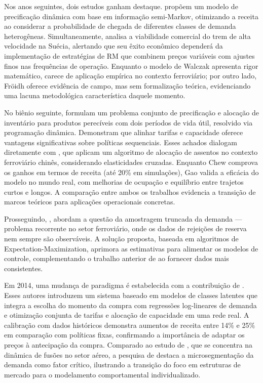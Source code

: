 Nos anos seguintes, dois estudos ganham destaque. \citet{Walczak2007} propõem um modelo de precificação dinâmica com base em informação semi-Markov, otimizando a receita ao considerar a probabilidade de chegada de diferentes classes de demanda heterogêneas. Simultaneamente, \citet{FROIDH2008268} analisa a viabilidade comercial do trem de alta velocidade na Suécia, alertando que seu êxito econômico dependerá da implementação de estratégias de RM que combinem preços variáveis com ajustes finos nas frequências de operação. Enquanto o modelo de Walczak apresenta rigor matemático, carece de aplicação empírica no contexto ferroviário; por outro lado, Fröidh oferece evidência de campo, mas sem formalização teórica, evidenciando uma lacuna metodológica característica daquele momento.

No biênio seguinte, \citet{CHEW2009} formulam um problema conjunto de precificação e alocação de inventário para produtos perecíveis com dois períodos de vida útil, resolvido via programação dinâmica. Demonstram que alinhar tarifas e capacidade oferece vantagens significativas sobre políticas sequenciais. Esses achados dialogam diretamente com \citet{Gao2010}, que aplicam um algoritmo de alocação de assentos no contexto ferroviário chinês, considerando elasticidades cruzadas. Enquanto Chew comprova os ganhos em termos de receita (até 20\% em simulações), Gao valida a eficácia do modelo no mundo real, com melhorias de ocupação e equilíbrio entre trajetos curtos e longos. A comparação entre ambos os trabalhos evidencia a transição de marcos teóricos para aplicações operacionais concretas.

Prosseguindo, \citet{Guo2012}, abordam a questão da amostragem truncada da demanda — problema recorrente no setor ferroviário, onde os dados de rejeições de reserva nem sempre são observáveis. A solução proposta, baseada em algoritmos de Expectation-Maximization, aprimora as estimativas para alimentar os modelos de controle, complementando o trabalho anterior de \citet{Walczak2007} ao fornecer dados mais consistentes.

Em 2014, uma mudança de paradigma é estabelecida com a contribuição de \citet{HETRAKUL201468}. Esses autores introduzem um sistema baseado em modelos de classes latentes que integra a escolha do momento da compra com regressões log-lineares de demanda e otimização conjunta de tarifas e alocação de capacidade em uma rede real. A calibração com dados históricos demonstra aumentos de receita entre 14\% e 25\% em comparação com políticas fixas, confirmando a importância de adaptar os preços à antecipação da compra. Comparado ao estudo de \citet{Dobson2013}, que se concentra na dinâmica de fusões no setor aéreo, a pesquisa de \citet{HETRAKUL201468} destaca a microsegmentação da demanda como fator crítico, ilustrando a transição do foco em estruturas de mercado para o modelamento comportamental individualizado.

